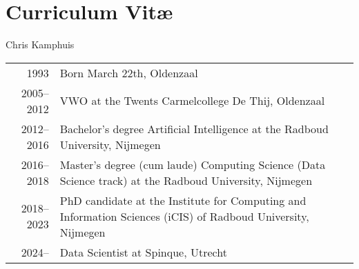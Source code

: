 \chapter*{Curriculum Vit\ae}

Chris Kamphuis

\vspace{\baselineskip}

\noindent%
\begin{tabular}{rp{.7\linewidth}}
	1993         & Born March 22th, Oldenzaal\\
	2005{--}2012 & VWO at the Twents Carmelcollege De Thij, Oldenzaal\\
	2012{--}2016 & Bachelor's degree Artificial Intelligence at the Radboud University, Nijmegen\\
	2016{--}2018 & Master's degree (cum laude) Computing Science (Data Science track) at the Radboud University, Nijmegen\\
	2018{--}2023 & PhD candidate at the Institute for Computing and Information Sciences (iCIS) of Radboud University, Nijmegen\\
	2024{--} & Data Scientist at Spinque, Utrecht
\end{tabular}